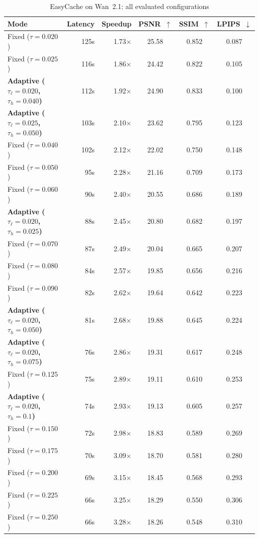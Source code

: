 \documentclass{article}
\begin{document}
\begin{table}[htbp]
\centering
\footnotesize
\setlength{\tabcolsep}{5pt}
\caption{EasyCache on Wan~2.1: all evaluated configurations}
\label{tab:app-ec-wan}
\begin{tabular}{lrrccc}
\toprule
\textbf{Mode} & \textbf{Latency} & \textbf{Speedup} & \textbf{PSNR~$\uparrow$} & \textbf{SSIM~$\uparrow$} & \textbf{LPIPS~$\downarrow$} \\
\midrule
  Fixed ($\tau=0.020$) & 125s & 1.73$\times$ & 25.58 & 0.852 & 0.087 \\
  Fixed ($\tau=0.025$) & 116s & 1.86$\times$ & 24.42 & 0.822 & 0.105 \\
  \textbf{Adaptive ($\tau_\ell=0.020$, $\tau_h=0.040$)} & 112s & 1.92$\times$ & 24.90 & 0.833 & 0.100 \\
  \textbf{Adaptive ($\tau_\ell=0.025$, $\tau_h=0.050$)} & 103s & 2.10$\times$ & 23.62 & 0.795 & 0.123 \\
  Fixed ($\tau=0.040$) & 102s & 2.12$\times$ & 22.02 & 0.750 & 0.148 \\
  Fixed ($\tau=0.050$) & 95s & 2.28$\times$ & 21.16 & 0.709 & 0.173 \\
  Fixed ($\tau=0.060$) & 90s & 2.40$\times$ & 20.55 & 0.686 & 0.189 \\
  \textbf{Adaptive ($\tau_\ell=0.020$, $\tau_h=0.025$)} & 88s & 2.45$\times$ & 20.80 & 0.682 & 0.197 \\
  Fixed ($\tau=0.070$) & 87s & 2.49$\times$ & 20.04 & 0.665 & 0.207 \\
  Fixed ($\tau=0.080$) & 84s & 2.57$\times$ & 19.85 & 0.656 & 0.216 \\
  Fixed ($\tau=0.090$) & 82s & 2.62$\times$ & 19.64 & 0.642 & 0.223 \\
  \textbf{Adaptive ($\tau_\ell=0.020$, $\tau_h=0.050$)} & 81s & 2.68$\times$ & 19.88 & 0.645 & 0.224 \\
  \textbf{Adaptive ($\tau_\ell=0.020$, $\tau_h=0.075$)} & 76s & 2.86$\times$ & 19.31 & 0.617 & 0.248 \\
  Fixed ($\tau=0.125$) & 75s & 2.89$\times$ & 19.11 & 0.610 & 0.253 \\
  \textbf{Adaptive ($\tau_\ell=0.020$, $\tau_h=0.1$)} & 74s & 2.93$\times$ & 19.13 & 0.605 & 0.257 \\
  Fixed ($\tau=0.150$) & 72s & 2.98$\times$ & 18.83 & 0.589 & 0.269 \\
  Fixed ($\tau=0.175$) & 70s & 3.09$\times$ & 18.70 & 0.581 & 0.280 \\
  Fixed ($\tau=0.200$) & 69s & 3.15$\times$ & 18.45 & 0.568 & 0.293 \\
  Fixed ($\tau=0.225$) & 66s & 3.25$\times$ & 18.29 & 0.550 & 0.306 \\
  Fixed ($\tau=0.250$) & 66s & 3.28$\times$ & 18.26 & 0.548 & 0.310 \\
\bottomrule
\end{tabular}
\end{table}
\end{document}
